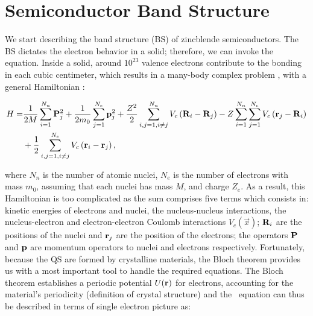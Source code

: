 \section{Semiconductor Band Structure}
\label{sec:chapter-1-semiconductor}
\vspace{-10mm}
We start describing the band structure (\gls{BS}) of zincblende semiconductors. The \gls{BS} dictates the electron behavior in a solid; therefore, we can invoke the \sch\, equation. Inside a solid, around $10^{23}$ valence electrons contribute to the bonding in each cubic centimeter, which results in a many-body complex problem \cite{piprek2017handbook}, with a general Hamiltonian \cite{alloul2010introduction,cardona2005fundamentals}: 

\begin{equation}
\begin{split}
	H  =  &\dfrac{1}{2M}\sum\limits_{i=1}^{N_{n}} \mathrm{\bf P}_{j}^{2} + \dfrac{1}{2m_{0}} \sum\limits_{j=1}^{N_{e}} \mathrm{\bf p}_{j}^{2} + \dfrac{Z^{2}}{2} \sum\limits_{i,j=1,i\neq j}^{N_{n}} V_{c}\left(\mathrm{\bf R}_{i}-\mathrm{\bf R}_{j}\right)-Z\sum\limits_{i=1}^{N_{n}}\sum\limits_{j=1}^{N_{e}}V_{c}\left(\mathrm{\bf r}_{j}-\mathrm{\bf R}_{i}\right) \\
	   & + \dfrac{1}{2} \sum\limits_{i,j=1,i\neq j}^{N_{e}} V_{c} \left(\mathrm{\bf r}_{i}-\mathrm{\bf r}_{j}\right),
\end{split}
\label{eq:chapter-1-solid-hamiltonian}
\end{equation}

where  $N_{n}$ is the number of atomic nuclei, $N_{e}$ is the number of electrons with mass $m_{0}$, assuming that each nuclei has mass $M$, and charge $Z_{e}$. As a result, this Hamiltonian is too complicated as the sum comprises five terms which consists in: kinetic energies of electrons and nuclei, the nucleus-nucleus interactions, the nucleus-electron and electron-electron Coulomb interactions $V_{c}\left(\vec{x}\right)$; $\mathrm{\bf R}_{i}$ are the positions of the nuclei and $\mathrm{\bf r}_{j}$ are the position of the electrons; the operators $\mathrm{\bf P}$ and $\mathrm{\bf p}$ are momentum operators to nuclei and electrons respectively\cite{alloul2010introduction}.
Fortunately, because  the \gls{QS} are formed by crystalline materials, the Bloch theorem provides us with a most important tool to handle the required equations. The Bloch theorem establishes a periodic potential $U(\displaystyle\mathrm{\bf r})$ for electrons, accounting for the material's periodicity (definition of crystal structure) and the \sch\, equation can thus be described in terms of single electron picture as:  


